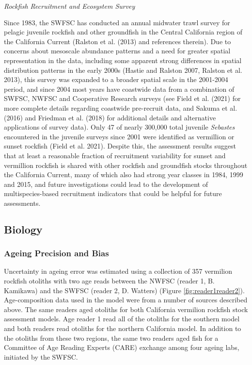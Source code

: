 \documentclass[
  english,
  a4paper,
]{article}
\begin{document}
\emph{Rockfish Recruitment and Ecosystem Survey}

Since 1983, the SWFSC has conducted an annual midwater trawl survey for pelagic
juvenile rockfish and other groundfish in the Central California region of the
California Current (Ralston et al. (2013) and references therein). Due to concerns
about mesoscale abundance patterns and a need for greater spatial representation
in the data, including some apparent strong differences in spatial distribution
patterns in the early 2000s (Hastie and Ralston 2007, Ralston et al. 2013), this survey was expanded
to a broader spatial scale in the 2001-2004 period, and since 2004 most years have
coastwide data from a combination of SWFSC, NWFSC and Cooperative Research surveys
(see Field et al. (2021) for more complete details regarding coastwide
pre-recruit data, and Sakuma et al. (2016) and Friedman et al. (2018)
for additional details and alternative applications of survey data). Only 47 of nearly 300,000 total juvenile \emph{Sebastes} encountered in the juvenile surveys since 2001 were identified as vermillion or sunset rockfish (Field et al. 2021). Despite this, the assessment results suggest that at least a reasonable fraction of recruitment variability for sunset and vermillion rockfish is shared with other rockfish and groundfish stocks throughout the California Current, many of which also had strong year classes in 1984, 1999 and 2015, and future investigations could lead to the development of multispecies-based recruitment indicators that could be helpful for future assessments.

\hypertarget{biology}{%
\subsection{Biology}\label{biology}}

\hypertarget{ageing-precision-and-bias}{%
\subsubsection{Ageing Precision and Bias}\label{ageing-precision-and-bias}}

Uncertainty in ageing error was estimated using a collection of 357 vermilion rockfish
otoliths with two age reads between the NWFSC (reader 1, B. Kamikawa) and the
SWFSC (reader 2, D. Watters) (Figure \ref{fig:reader1reader2}).
Age-composition data used in the model were from a number of sources described
above. The same readers aged otoliths for both California vermilion rockfish stock assessment models.
Age reader 1 read all of the otoliths for the southern model and both readers read
otoliths for the northern California model. In addition to the otoliths from these
two regions, the same two readers aged fish for a Committee of Age Reading Experts
(CARE) exchange among four ageing labs, initiated by the SWFSC.
\end{document}
